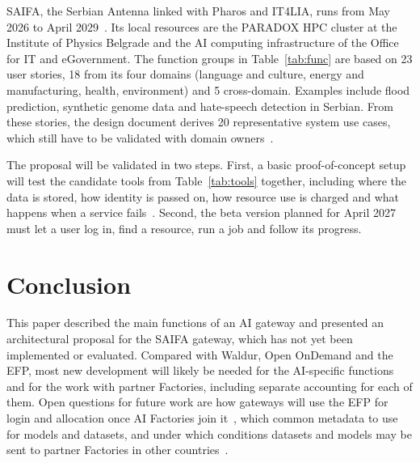 \documentclass[conference,a4paper]{IEEEtran}
\newif\ifizmene
\DeclareRobustCommand{\chg}[1]{\ifizmene{\color{blue}#1}\else#1\fi}
\DeclareRobustCommand{\roz}[1]{\ifizmene{\color{roze}#1}\else#1\fi}
\DeclareRobustCommand{\nov}[1]{\ifizmene{\color{nova}#1}\else#1\fi}
\DeclareRobustCommand{\tri}[1]{\ifizmene{\color{treca}#1}\else#1\fi}
\begin{document}
SAIFA, \chg{the Serbian Antenna linked with Pharos and IT4LIA, runs} from May 2026 to April 2029~\cite{cordis_saifa}. Its local resources are the PARADOX HPC cluster at the Institute of Physics Belgrade and the AI \roz{computing infrastructure of the Office for IT and eGovernment}. \roz{The function groups in Table~\ref{tab:func}} \nov{are based on} \roz{23 user stories, 18 from its four domains (language and culture, energy and manufacturing, health, environment) and 5 cross-domain. Examples include flood prediction, synthetic genome data and hate-speech detection in Serbian.} \nov{From these stories, the design \tri{document} derives 20 representative system use cases, which still have to be validated with domain owners}~\cite{saifa_d31}.

\nov{The proposal will be validated in two steps. First, a} basic proof-of-concept setup \nov{will} test the candidate tools \nov{from Table~\ref{tab:tools}} together\nov{, including where the data is stored, how identity is passed on, how resource use is charged and what happens when a service fails}~\cite{saifa_d31}. \nov{Second, the beta version planned for April 2027 must let a user log in, find a resource, run a job and follow its progress.}

\section{Conclusion}

\nov{This paper described the main functions of an AI gateway and presented an architectural proposal for the SAIFA gateway, which has not yet been implemented or evaluated. Compared with Waldur, Open OnDemand and the EFP, most new development will likely be needed for the AI-specific functions and for the work with partner Factories, including separate accounting for each of them.} \chg{Open questions} \roz{for future work} \chg{are how gateways will use the EFP for login and allocation} \tri{once AI Factories join it~\cite{eurohpc_efp},} \chg{which common metadata to use for models and datasets, and} \tri{under which conditions datasets and models may be sent to partner Factories in other countries~\cite{saifa_d31}.}



\end{document}
